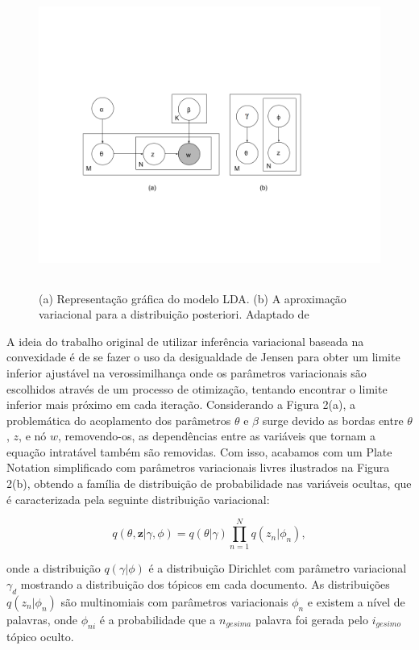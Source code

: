 \documentclass[12pt,a4paper]{article}
\begin{document}
\begin{figure}[H]
	\centering
    \includegraphics[height=10cm]{images/figure_2.png}
    \caption{(a) Representação gráfica do modelo LDA. (b) A aproximação variacional para a distribuição posteriori. Adaptado de }
\end{figure}

A ideia do trabalho original de utilizar inferência variacional baseada na convexidade é de se fazer o uso da desigualdade de Jensen para obter um limite inferior ajustável na verossimilhança \cite{jordan1999introduction} onde os parâmetros variacionais são escolhidos através de um processo de otimização,
 tentando encontrar o limite inferior mais próximo em cada iteração. Considerando a Figura 2(a), a problemática do acoplamento dos parâmetros $\theta$ e $\beta$ surge devido as bordas entre $\theta$, $z$,
 e nó $w$, removendo-os, as dependências entre as variáveis que tornam a equação intratável também são removidas. Com isso,
 acabamos com um Plate Notation simplificado com parâmetros variacionais livres ilustrados na Figura 2(b), obtendo a família de distribuição de probabilidade nas variáveis ocultas,
 que é caracterizada pela seguinte distribuição variacional:

\begin{equation}
q(\theta,\textbf{z}|\gamma,\phi)=q(\theta|\gamma)\prod_{n=1}^{N}q(z_n|\phi_n), 
\end{equation}

onde a distribuição  $q(\gamma|\phi)$ é a distribuição Dirichlet com parâmetro variacional $\gamma_d$ mostrando a distribuição dos tópicos em cada documento.
 As distribuições $q(z_n | \phi_n)$ são multinomiais com parâmetros variacionais $\phi_n$ e existem a nível de palavras, onde $\phi_{ni}$ é a probabilidade que a $n_{gesima}$ palavra foi gerada pelo $i_{gesimo}$ tópico oculto.
\end{document}
